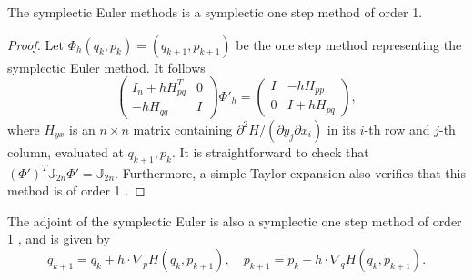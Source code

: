 \begin{theorem} \cite{hairer2006geometric}
The symplectic Euler methods is a symplectic one step method of order 1.
\end{theorem}
\begin{proof}
Let $\Phi_h(q_k,p_k) = (q_{k+1},p_{k+1})$ be the one step method representing the symplectic Euler method. It follows
\begin{equation*}
	\begin{pmatrix}
		I_n + h H_{pq}^T & 0 \\
		-hH_{qq} & I	
	\end{pmatrix}
	\Phi'_h = 
	\begin{pmatrix}
		I & -h H_{pp} \\
		0 & I+ h H_{pq}
	\end{pmatrix},
\end{equation*}
where $H_{yx}$ is an $n\times n$ matrix containing ${\partial^2 H }/{(\partial y_j \partial x_i)}$ in its $i$-th row and $j$-th column, evaluated at $q_{k+1},p_k$. It is straightforward to check that $(\Phi')^T \mathbb J_{2n} \Phi' = \mathbb J_{2n}$. Furthermore, a simple Taylor expansion also verifies that this method is of order 1 \cite{hairer2006geometric}.
\end{proof}

The adjoint of the symplectic Euler is also a symplectic one step method of order 1 \cite{hairer2006geometric}, and is given by
\begin{equation}
	q_{k+1} = q_k + h \cdot \nabla_p H(q_k,p_{k+1}),\quad p_{k+1} = p_k - h \cdot \nabla_q H(q_{k},p_{k+1}).
\end{equation}

